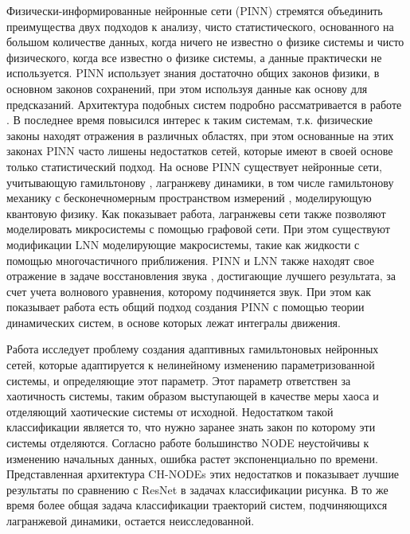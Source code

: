 \documentclass[a4paper, 12pt]{article}
\begin{document}
	Физически-информированные нейронные сети (PINN) стремятся объединить преимущества двух подходов к анализу, чисто статистического, основанного на большом количестве данных, когда ничего не известно о физике системы и чисто физического, когда все известно о физике системы, а данные практически не используется. PINN использует знания достаточно общих законов физики, в основном законов сохранений, при этом используя данные как основу для предсказаний. Архитектура подобных систем подробно рассматривается в работе \cite{PINNreview}. В последнее время повысился интерес к таким системам, т.к. физические законы находят отражения в различных областях, при этом основанные на этих законах PINN часто лишены недостатков сетей, которые имеют в своей основе только статистический подход. На основе PINN существует нейронные сети, учитывающую гамильтонову \cite{HNN}, лагранжеву динамики\cite{article}, в том числе гамильтонову механику с бесконечномерным пространством измерений \cite{quantumHNN}, моделирующую квантовую физику. Как показывает работа, лагранжевы сети также позволяют моделировать микросистемы с помощью графовой сети. При этом существуют модификации LNN моделирующие макросистемы, такие как жидкости с помощью многочастичного приближения. PINN и LNN также находят свое отражение в задаче восстановления звука \cite{PINNsoundwave}, достигающие лучшего результата, за счет учета волнового уравнения, которому подчиняется звук. При этом как показывает работа есть общий подход создания PINN с помощью теории динамических систем, в основе которых лежат интегралы движения.

Работа \cite{HNNadapt} исследует проблему создания адаптивных гамильтоновых нейронных сетей, которые адаптируется к нелинейному изменению параметризованной системы, и определяющие этот параметр. Этот параметр ответствен за хаотичность системы, таким образом выступающей в качестве меры хаоса и отделяющий хаотические системы от исходной. Недостатком такой классификации является то, что нужно заранее знать закон по которому эти системы отделяются. Согласно работе \cite{HNNrobustclass} большинство NODE неустойчивы к изменению начальных данных, ошибка растет экспоненциально по времени. Представленная архитектура CH-NODEs этих недостатков и показывает лучшие результаты по сравнению с ResNet в задачах классификации рисунка. В то же время более общая задача классификации траекторий систем, подчиняющихся лагранжевой динамики, остается неисследованной. 
\end{document}
